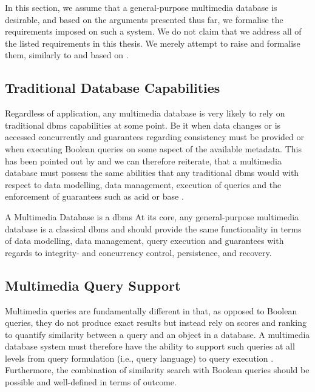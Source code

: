 In this section, we assume that a general-purpose multimedia database is desirable, and based on the arguments presented thus far, we formalise the requirements imposed on such a system. We do not claim that we address all of the listed requirements in this thesis. We merely attempt to raise and formalise them, similarly to and based on \cite{Adjeroh:1997Multimedia,Jonsson:2016Ten,Khaleel:2021An}.

\subsection{Traditional Database Capabilities}
Regardless of application, any multimedia database is very likely to rely on traditional \acrshort{dbms} capabilities at some point. Be it when data changes or is accessed concurrently and guarantees regarding consistency must be provided or when executing Boolean queries on some aspect of the available metadata. This has been pointed out by \cite{Adjeroh:1997Multimedia,Khaleel:2021An} and we can therefore reiterate, that a multimedia database must possess the same abilities that any traditional \acrshort{dbms} would with respect to data modelling, data management, execution of queries and the enforcement of guarantees such as \acrshort{acid} \cite{Haerder:1983principles} or \acrshort{base} \cite{Pritchett:2008Base}.

\begin{requirement}[label=requirement:classical_dbms]{A Multimedia Database is a \acrshort{dbms}}{}
    At its core, any general-purpose multimedia database is a classical \acrlong{dbms} and should provide the same functionality in terms of data modelling, data management, query execution and guarantees with regards to integrity- and concurrency control, persistence, and recovery.
\end{requirement}

\subsection{Multimedia Query Support}
Multimedia queries are fundamentally different in that, as opposed to Boolean queries, they do not produce exact results but instead rely on scores and ranking to quantify similarity between a query and an object in a database. A multimedia database system must therefore have the ability to support such queries at all levels from query formulation (i.e., query language) to query execution \cite{Adjeroh:1997Multimedia}. Furthermore, the combination of similarity search with Boolean queries should be possible and well-defined in terms of outcome.

